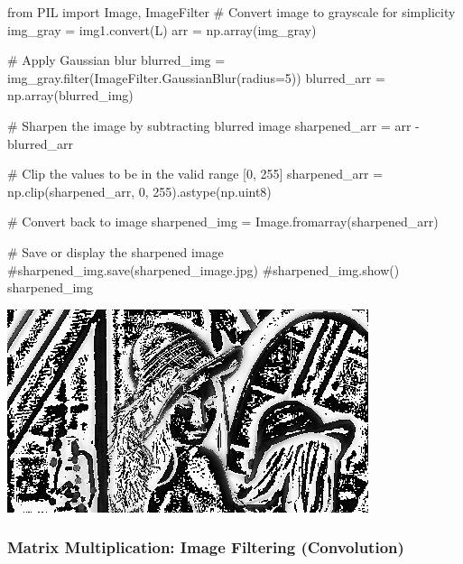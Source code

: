 \documentclass[
  letterpaper,
  DIV=11,
  numbers=noendperiod]{scrreprt}
\newenvironment{Shaded}{\begin{snugshade}}{\end{snugshade}}
\newcommand{\BuiltInTok}[1]{\textcolor[rgb]{0.00,0.23,0.31}{#1}}
\newcommand{\CommentTok}[1]{\textcolor[rgb]{0.37,0.37,0.37}{#1}}
\newcommand{\DecValTok}[1]{\textcolor[rgb]{0.68,0.00,0.00}{#1}}
\newcommand{\ImportTok}[1]{\textcolor[rgb]{0.00,0.46,0.62}{#1}}
\newcommand{\NormalTok}[1]{\textcolor[rgb]{0.00,0.23,0.31}{#1}}
\newcommand{\OperatorTok}[1]{\textcolor[rgb]{0.37,0.37,0.37}{#1}}
\newcommand{\StringTok}[1]{\textcolor[rgb]{0.13,0.47,0.30}{#1}}
\theoremstyle{plain}
\theoremstyle{definition}
\theoremstyle{remark}
\begin{document}
\begin{Shaded}
\begin{Highlighting}[]
\ImportTok{from}\NormalTok{ PIL }\ImportTok{import}\NormalTok{ Image, ImageFilter}
\CommentTok{\# Convert image to grayscale for simplicity}
\NormalTok{img\_gray }\OperatorTok{=}\NormalTok{ img1.convert(}\StringTok{\textquotesingle{}L\textquotesingle{}}\NormalTok{)}
\NormalTok{arr }\OperatorTok{=}\NormalTok{ np.array(img\_gray)}

\CommentTok{\# Apply Gaussian blur}
\NormalTok{blurred\_img }\OperatorTok{=}\NormalTok{ img\_gray.}\BuiltInTok{filter}\NormalTok{(ImageFilter.GaussianBlur(radius}\OperatorTok{=}\DecValTok{5}\NormalTok{))}
\NormalTok{blurred\_arr }\OperatorTok{=}\NormalTok{ np.array(blurred\_img)}

\CommentTok{\# Sharpen the image by subtracting blurred image}
\NormalTok{sharpened\_arr }\OperatorTok{=}\NormalTok{ arr }\OperatorTok{{-}}\NormalTok{ blurred\_arr}

\CommentTok{\# Clip the values to be in the valid range [0, 255]}
\NormalTok{sharpened\_arr }\OperatorTok{=}\NormalTok{ np.clip(sharpened\_arr, }\DecValTok{0}\NormalTok{, }\DecValTok{255}\NormalTok{).astype(np.uint8)}

\CommentTok{\# Convert back to image}
\NormalTok{sharpened\_img }\OperatorTok{=}\NormalTok{ Image.fromarray(sharpened\_arr)}

\CommentTok{\# Save or display the sharpened image}
\CommentTok{\#sharpened\_img.save(\textquotesingle{}sharpened\_image.jpg\textquotesingle{})}
\CommentTok{\#sharpened\_img.show()}
\NormalTok{sharpened\_img}
\end{Highlighting}
\end{Shaded}

\includegraphics{module_1_files/figure-pdf/cell-13-output-1.png}

\subsubsection{Matrix Multiplication: Image Filtering
(Convolution)}\label{matrix-multiplication-image-filtering-convolution}
\end{document}
